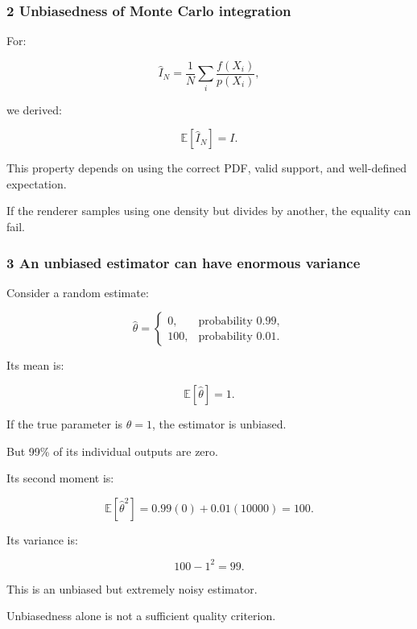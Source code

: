 \subsubsection{2 Unbiasedness of Monte Carlo integration}\label{02-foundations-ii-ch030-unbiasedness-of-monte-carlo-integration}

\hypertarget{02-foundations-ii-ch030-unbiasedness-of-monte-carlo-integration}{}

For:

\[
 \widehat I_N= \frac1N\sum_i\frac{f(X_i)}{p(X_i)},
\]

we derived:

\[
 \mathbb E[\widehat I_N]=I.
\]

This property depends on using the correct PDF, valid support, and well-defined expectation.

If the renderer samples using one density but divides by another, the equality can fail.

\subsubsection{3 An unbiased estimator can have enormous variance}\label{02-foundations-ii-ch030-an-unbiased-estimator-can-have-enormous-variance}

\hypertarget{02-foundations-ii-ch030-an-unbiased-estimator-can-have-enormous-variance}{}

Consider a random estimate:

\[
 \widehat\theta= \begin{cases} 0,&\text{probability }0.99,\\ 100,&\text{probability }0.01. \end{cases}
\]

Its mean is:

\[
 \mathbb E[\widehat\theta]=1.
\]

If the true parameter is \(\theta=1\), the estimator is unbiased.

But 99\% of its individual outputs are zero.

Its second moment is:

\[
 \mathbb E[\widehat\theta^2] = 0.99(0)+0.01(10000)=100.
\]

Its variance is:

\[
 100-1^2=\boxed{99}.
\]

This is an unbiased but extremely noisy estimator.

Unbiasedness alone is not a sufficient quality criterion.

